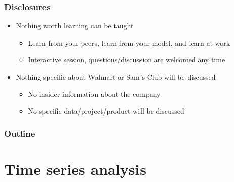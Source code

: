 \documentclass[aspectratio=169,xcolor=x11names,table]{beamer}
\begin{document}
\begin{frame}
	\frametitle{Disclosures}
	\begin{itemize}
		\item Nothing worth learning can be taught
			\begin{itemize}
				\item Learn from your peers, learn from your model, and learn at work
				\item Interactive session, questions/discussion are welcomed any time
			\end{itemize}
			\vspace{1cm}
		\item Nothing specific about Walmart or Sam's Club will be discussed
			\begin{itemize}
				\item No insider information about the company
				\item No specific data/project/product will be discussed
			\end{itemize}
	\end{itemize}
\end{frame}

\begin{frame}
	\frametitle{Outline}
	\tableofcontents[hideallsubsections]
\end{frame}

\section{Time series analysis}
\end{document}
